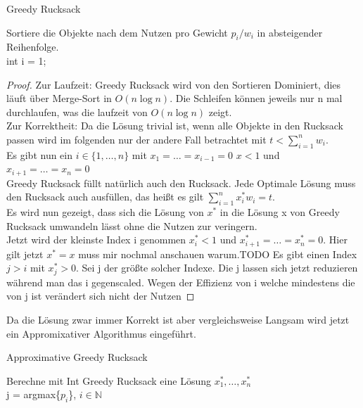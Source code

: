\documentclass{report}
\begin{document}
\begin{algorithm}[H]
\caption{Greedy Rucksack}
Sortiere die Objekte nach dem Nutzen pro Gewicht $p_{i}/w_{i}$ in absteigender Reihenfolge.\\
int i = 1;\\
\end{algorithm}
\begin{proof}
	Zur Laufzeit: Greedy Rucksack wird von den Sortieren Dominiert, dies läuft über Merge-Sort in $O(n \log n)$. Die Schleifen können jeweils nur n mal durchlaufen, was die laufzeit von $O(n \log n)$ zeigt.\\
	Zur Korrektheit: Da die Lösung trivial ist, wenn alle Objekte in den Rucksack passen wird im folgenden nur der andere Fall betrachtet mit $t < \sum_{i=1}^{n} w_{i}$.\\
	Es gibt nun ein $i \in \{1, \dots, n\}$ mit $x_{1} = \dots = x_{i-1} = 0 $ $x < 1 $ und $x_{i+1} = \dots = x_{n} = 0$\\
	Greedy Rucksack füllt natürlich auch den Rucksack. Jede Optimale Lösung muss den Rucksack auch ausfüllen, das heißt es gilt $\sum_{i=1}^{n} x_{i}^{*} w_{i} = t$.\\
	Es wird nun gezeigt, dass sich die Lösung von $x^{*}$ in die Lösung x von Greedy Rucksack umwandeln lässt ohne die Nutzen zur veringern.\\
	Jetzt wird der kleinste Index i genommen $x_{i}^{*} < 1$ und $x_{i+1}^{*} = \dots = x_{n}^{*} = 0$. Hier gilt jetzt $x^{*} = x$ muss mir nochmal anschauen warum.TODO
	Es gibt einen Index $j > i$ mit $x_{j}^{*} > 0$. Sei j der größte solcher Indexe. Die j lassen sich jetzt reduzieren während man das i gegenscaled. Wegen der Effizienz von i welche mindestens die von j ist verändert sich nicht der Nutzen
\end{proof}
Da die Lösung zwar immer Korrekt ist aber vergleichsweise Langsam wird jetzt ein Appromixativer Algorithmus eingeführt.
\begin{algorithm}[H]
\caption{Approximative Greedy Rucksack}
Berechne mit Int Greedy Rucksack eine Lösung $x_{1}^{*}, \dots, x_{n}^{*}$\\
j = argmax\{$p_{i}$\}, $ i \in \mathbb{N}$\\
\end{algorithm}
\end{document}
